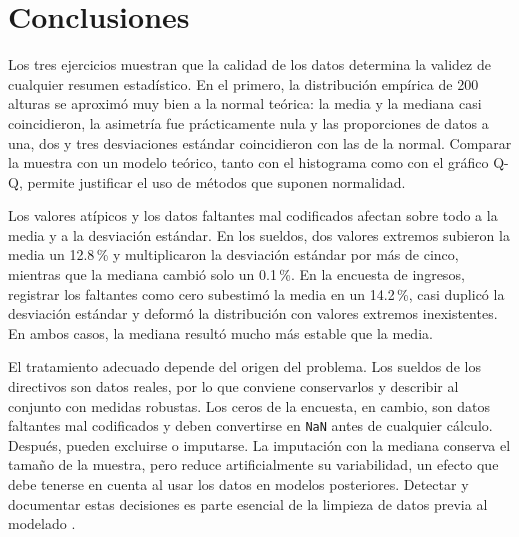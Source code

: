 \documentclass[11pt,letterpaper]{article}
\begin{document}
\section{Conclusiones}

Los tres ejercicios muestran que la calidad de los datos determina la validez de cualquier resumen estadístico. En el primero, la distribución empírica de 200 alturas se aproximó muy bien a la normal teórica: la media y la mediana casi coincidieron, la asimetría fue prácticamente nula y las proporciones de datos a una, dos y tres desviaciones estándar coincidieron con las de la normal. Comparar la muestra con un modelo teórico, tanto con el histograma como con el gráfico Q-Q, permite justificar el uso de métodos que suponen normalidad.

Los valores atípicos y los datos faltantes mal codificados afectan sobre todo a la media y a la desviación estándar. En los sueldos, dos valores extremos subieron la media un 12.8\,\% y multiplicaron la desviación estándar por más de cinco, mientras que la mediana cambió solo un 0.1\,\%. En la encuesta de ingresos, registrar los faltantes como cero subestimó la media en un 14.2\,\%, casi duplicó la desviación estándar y deformó la distribución con valores extremos inexistentes. En ambos casos, la mediana resultó mucho más estable que la media.

El tratamiento adecuado depende del origen del problema. Los sueldos de los directivos son datos reales, por lo que conviene conservarlos y describir al conjunto con medidas robustas. Los ceros de la encuesta, en cambio, son datos faltantes mal codificados y deben convertirse en \texttt{NaN} antes de cualquier cálculo. Después, pueden excluirse o imputarse. La imputación con la mediana conserva el tamaño de la muestra, pero reduce artificialmente su variabilidad, un efecto que debe tenerse en cuenta al usar los datos en modelos posteriores. Detectar y documentar estas decisiones es parte esencial de la limpieza de datos previa al modelado \parencite{tecnm2026_documento_fuente,brownlee2019}.

\end{document}
